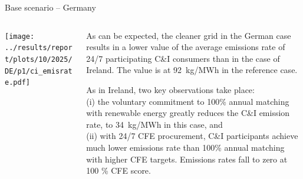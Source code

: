   
  
  \begin{frame}{Base scenario -- Germany}
  
  {\footnotesize
  \vspace{0.3cm}
  
  \begin{columns}[T]
  \begin{column}{9cm}
  \centering
  
  \texttt{[image: ../results/report/plots/10/2025/DE/p1/ci\_emisrate.pdf]}
  
  \end{column}
  \begin{column}{6cm}
  
  \vspace{0.1cm}
  As can be expected, the cleaner grid in the German case results in 
  a lower value of the average emissions rate of 24/7 participating 
  C\&I consumers than in the case of Ireland. The value is at 92~kg/MWh 
  in the reference case.
  
  \vspace{0.3cm}
  As in Ireland, \alert{two key observations} take place: \\ 

  \vspace{0.1cm}
  (i) the voluntary commitment to 100\% annual matching 
  with renewable energy greatly reduces the C\&I emission rate, to 34~kg/MWh
  in this case, and \\
  \vspace{0.1cm}
  (ii) with 24/7 CFE procurement, C\&I participants achieve much lower emissions 
  rate than 100\% annual matching with higher CFE targets. Emissions rates 
  fall to zero at 100 \% CFE score.

  \end{column}
  \end{columns}
  }
  \end{frame}
  



